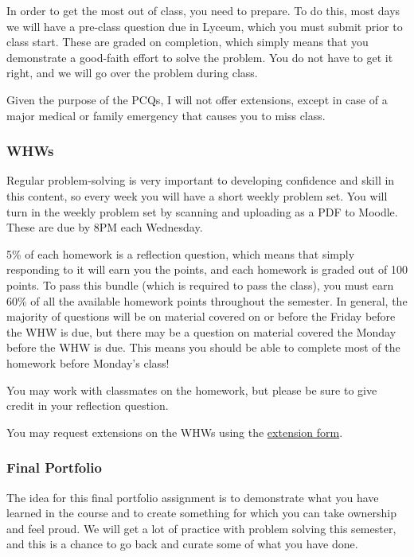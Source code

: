 \documentclass[
  letterpaper,
  DIV=11,
  numbers=noendperiod]{scrartcl}
\begin{document}
In order to get the most out of class, you need to prepare. To do this,
most days we will have a pre-class question due in Lyceum, which you
must submit prior to class start. These are graded on completion, which
simply means that you demonstrate a good-faith effort to solve the
problem. You do not have to get it right, and we will go over the
problem during class.

Given the purpose of the PCQs, I will not offer extensions, except in
case of a major medical or family emergency that causes you to miss
class.

\subsubsection{WHWs}

Regular problem-solving is very important to developing confidence and
skill in this content, so every week you will have a short weekly
problem set. You will turn in the weekly problem set by scanning and
uploading as a PDF to Moodle. These are due by 8PM each Wednesday.

5\% of each homework is a reflection question, which means that simply
responding to it will earn you the points, and each homework is graded
out of 100 points. To pass this bundle (which is required to pass the
class), you must earn 60\% of all the available homework points
throughout the semester. In general, the majority of questions will be
on material covered on or before the Friday before the WHW is due, but
there may be a question on material covered the Monday before the WHW is
due. This means you should be able to complete most of the homework
before Monday's class!

You may work with classmates on the homework, but please be sure to give
credit in your reflection question.

You may request extensions on the WHWs using the
\href{https://forms.gle/eFx7y7FoSdoukKGC6}{extension form}.

\subsubsection{Final Portfolio}

The idea for this final portfolio assignment is to demonstrate what you
have learned in the course and to create something for which you can
take ownership and feel proud. We will get a lot of practice with
problem solving this semester, and this is a chance to go back and
curate some of what you have done.
\end{document}
